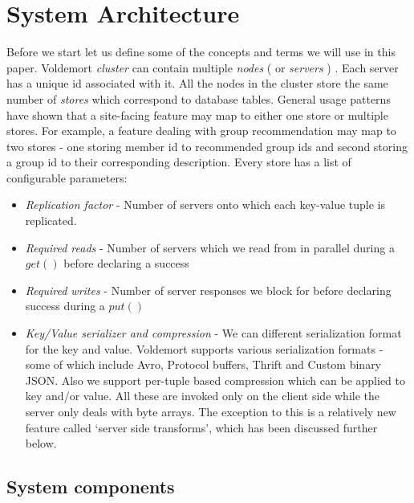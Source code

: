 \documentclass[10pt,twocolumn,preprint,natbib,authoryear]{sigplanconf}
\begin{document}
\section{System Architecture}
\label{sec:system_architecture}

Before we start let us define some of the concepts and terms we will use in this paper. Voldemort \emph{cluster} can contain multiple \emph{nodes} ( or \emph{servers} ) . Each server has a unique id associated with it. All the nodes in the cluster store the same number of \emph{stores} which correspond to database tables. General usage patterns have shown that a site-facing feature may map to either one store or multiple stores. For example, a feature dealing with group recommendation may map to two stores - one storing member id to recommended group ids and second storing a group id to their corresponding description. Every store has a list of configurable parameters:
\begin{itemize}
	\item \emph {Replication factor} - Number of servers onto which each key-value tuple is replicated. 
	\item \emph {Required reads} - Number of servers which we read from in parallel during a $get()$ before declaring a success
	\item \emph {Required writes} - Number of server responses we block for before declaring success during a $put()$
	\item \emph {Key/Value serializer and compression} - We can different serialization format for the key and value. Voldemort supports various serialization formats - some of which include Avro, Protocol buffers, Thrift and Custom binary JSON. Also we support per-tuple based compression which can be applied to key and/or value. All these are invoked only on the client side while the server only deals with byte arrays. The exception to this is a relatively new feature called `server side transforms', which has been discussed further below. 
\end{itemize}



\subsection{System components}
\label{sec:system_architecture:system_components}
\end{document}
